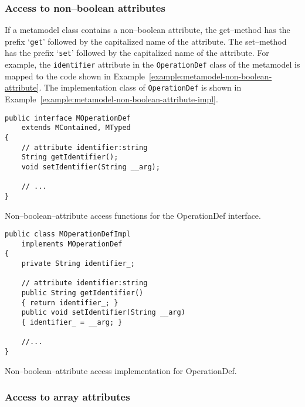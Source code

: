 \subsubsection{Access to non--boolean attributes}

If a metamodel class contains a non--boolean attribute, the get--method has the
prefix `{\tt get}' followed by the capitalized name of the attribute. The
set--method has the prefix `{\tt set}' followed by the capitalized name of the
attribute. For example, the {\tt identifier} attribute in the {\tt OperationDef}
class of the metamodel is mapped to the code shown in
Example~\ref{example:metamodel-non-boolean-attribute}. The implementation class
of {\tt OperationDef} is shown in
Example~\ref{example:metamodel-non-boolean-attribute-impl}.

\begin{Example}
\begin{minifbox}
\begin{verbatim}
public interface MOperationDef
    extends MContained, MTyped
{
    // attribute identifier:string
    String getIdentifier();
    void setIdentifier(String __arg);

    // ...
}
\end{verbatim}
\end{minifbox}
\caption{Non--boolean--attribute access functions for the OperationDef
interface.}
\label{example:metamodel-non-boolean-attribute}
\end{Example}

\begin{Example}
\begin{minifbox}
\begin{verbatim}
public class MOperationDefImpl
    implements MOperationDef
{
    private String identifier_;

    // attribute identifier:string
    public String getIdentifier()
    { return identifier_; }
    public void setIdentifier(String __arg)
    { identifier_ = __arg; }

    //...
}
\end{verbatim}
\end{minifbox}
\caption{Non--boolean--attribute access implementation for OperationDef.}
\label{example:metamodel-non-boolean-attribute-impl}
\end{Example}

\subsubsection{Access to array attributes}

